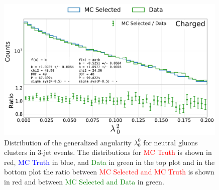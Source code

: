 \begin{figure}[h!]
  \centerfloat
  \includegraphics[width=0.99\textwidth, trim=0 0 0 0, clip, page=10]{figures/quarks/generalized_angularities_cha-down_sample=1.00-ML_vars=vertex-selection=b-ejet_min=4-n_iter_RS_lgb=99-n_iter_RS_xgb=9-cdot_cut=0.90-version=19.pdf}
  \caption[Generalized Angularities for Neutral Gluons Jets: $\lambda_0^0$]
          {Distribution of the generalized angularity $\lambda_0^0$ for neutral gluons clusters in 3-jet events. The distributions for \textcolor{red}{MC Truth} is shown in red, \textcolor{blue}{MC Truth} in blue, and \textcolor{green}{Data} in green in the top plot and in the bottom plot the ratio between \textcolor{red}{MC Selected and MC Truth} is shown in red and between \textcolor{green}{MC Selected and Data} in green. }
  \label{fig:q:generalized_angularities_neu_lambda_0_0}
\end{figure}
\clearpage





